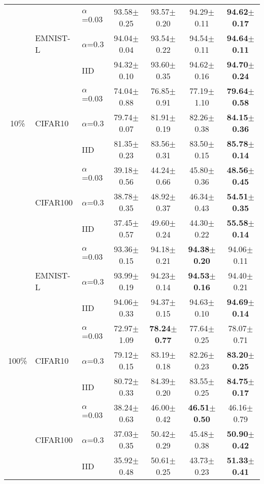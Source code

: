 \documentclass[runningheads]{llncs}
\def\cifart{{\textsc{CIFAR10}}}
\def\cifarh{{\textsc{CIFAR100}}}
\def\emnist{{\textsc{EMNIST-L}}}
\begin{document}
\begin{table}[tb!]
\begin{center}
\begin{tabular}{cllcccc}
            \midrule
\multirow{9}{*}{10\%}
& \multirow{3}{*}{\emnist}
                  & $\alpha$=0.03 & 93.58$\pm$0.25 & 93.57$\pm$0.20 & 94.29$\pm$0.11 & \textbf{94.62$\pm$0.17} \\ 
                & & $\alpha$=0.3  & 94.04$\pm$0.04 & 93.54$\pm$0.22 & 94.54$\pm$0.11 & \textbf{94.64$\pm$0.11} \\  
                & & IID           & 94.32$\pm$0.10 & 93.60$\pm$0.35 & 94.62$\pm$0.16 & \textbf{94.70$\pm$0.24} \\
\cline{2-7}
& \multirow{3}{*}{\cifart}    
                  & $\alpha$=0.03 & 74.04$\pm$0.88 & 76.85$\pm$0.91 & 77.19$\pm$1.10 & \textbf{79.64$\pm$0.58} \\  
                & & $\alpha$=0.3  & 79.74$\pm$0.07 & 81.91$\pm$0.19 & 82.26$\pm$0.38 & \textbf{84.15$\pm$0.36} \\  
                & & IID           & 81.35$\pm$0.23 & 83.56$\pm$0.31 & 83.50$\pm$0.15 & \textbf{85.78$\pm$0.14} \\
\cline{2-7}
& \multirow{3}{*}{\cifarh}    
                  & $\alpha$=0.03 & 39.18$\pm$0.56 & 44.24$\pm$0.66 & 45.80$\pm$0.36 & \textbf{48.56$\pm$0.45} \\  
                & & $\alpha$=0.3  & 38.78$\pm$0.35 & 48.92$\pm$0.37 & 46.34$\pm$0.43 & \textbf{54.51$\pm$0.35} \\  
                & & IID           & 37.45$\pm$0.57 & 49.60$\pm$0.24 & 44.30$\pm$0.22 & \textbf{55.58$\pm$0.14} \\
            \midrule
\multirow{9}{*}{100\%}
& \multirow{3}{*}{\emnist}
                  & $\alpha$=0.03 & 93.36$\pm$0.15 & 94.18$\pm$0.21 & \textbf{94.38$\pm$0.20} & 94.06$\pm$0.11 \\  
                & & $\alpha$=0.3  & 93.99$\pm$0.19 & 94.23$\pm$0.14 & \textbf{94.53$\pm$0.16} & 94.40$\pm$0.21 \\  
                & & IID           & 94.06$\pm$0.33 & 94.37$\pm$0.15 & 94.63$\pm$0.10 & \textbf{94.69$\pm$0.14} \\
\cline{2-7}
& \multirow{3}{*}{\cifart}          
                  & $\alpha$=0.03 & 72.97$\pm$1.09 & \textbf{78.24$\pm$0.77} & 77.64$\pm$0.25 & 78.07$\pm$0.71 \\  
                & & $\alpha$=0.3  & 79.12$\pm$0.15 & 83.19$\pm$0.18 & 82.26$\pm$0.23 & \textbf{83.20$\pm$0.25} \\  
                & & IID           & 80.72$\pm$0.33 & 84.39$\pm$0.20 & 83.55$\pm$0.25 & \textbf{84.75$\pm$0.17} \\
\cline{2-7}
& \multirow{3}{*}{\cifarh}
                  & $\alpha$=0.03 & 38.24$\pm$0.63 & 46.00$\pm$0.42 & \textbf{46.51$\pm$0.50} & 46.16$\pm$0.79 \\  
                & & $\alpha$=0.3  & 37.03$\pm$0.35 & 50.42$\pm$0.29 & 45.48$\pm$0.38 & \textbf{50.90$\pm$0.42} \\  
                & & IID           & 35.92$\pm$0.48 & 50.61$\pm$0.25 & 43.73$\pm$0.23 & \textbf{51.33$\pm$0.41} \\
\end{tabular}
    \end{center}
\end{table}
 
\end{document}
